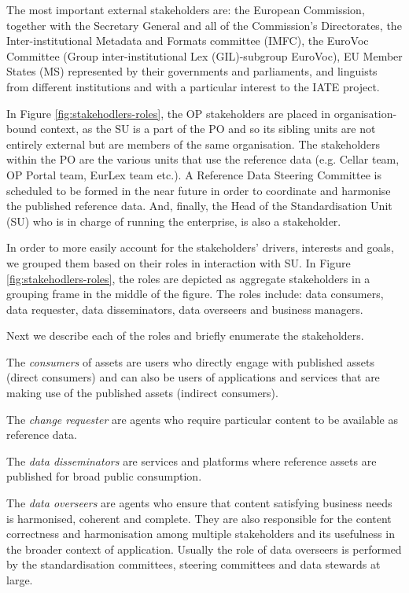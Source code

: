 	The most important external stakeholders are: the European Commission, together with the Secretary General and all of the Commission’s Directorates, the Inter-institutional Metadata and Formats committee (IMFC), the EuroVoc Committee (Group inter-institutional Lex (GIL)-subgroup EuroVoc), EU Member States (MS) represented by their governments and parliaments, and linguists from different institutions and with a particular interest to the IATE project.
	 
	In Figure \ref{fig:stakehodlers-roles}, the OP stakeholders are placed in organisation-bound context, as the SU is a part of the PO and so its sibling units are not entirely external but are members of the same organisation. The stakeholders within the PO are the various units that use the reference data (e.g. Cellar team, OP Portal team, EurLex team etc.). A Reference Data Steering Committee is scheduled to be formed in the near future in order to coordinate and harmonise the published reference data. And, finally, the Head of the Standardisation Unit (SU) who is in charge of running the enterprise, is also a stakeholder.
	 
	In order to more easily account for the stakeholders' drivers, interests and goals, we grouped them based on their roles in interaction with SU. In Figure \ref{fig:stakehodlers-roles}, the roles are depicted as aggregate stakeholders in a grouping frame in the middle of the figure. The roles include: data consumers, data requester, data disseminators, data overseers and business managers. 
	
	Next we describe each of the roles and briefly enumerate the stakeholders.
	 
	The \textit{consumers} of assets are users who directly engage with published assets (direct consumers) and can also be users of applications and services that are making use of the published assets (indirect consumers).
	
	The \textit{change requester} are agents who require particular content to be available as reference data. 
	
	The \textit{data disseminators} are services and platforms where reference assets are published for broad public consumption.
	
	The \textit{data overseers} are agents who ensure that content satisfying business needs is harmonised, coherent and complete. They are also responsible for the content correctness and harmonisation among multiple stakeholders and its usefulness in the broader context of application. Usually the role of data overseers is performed by the standardisation committees, steering committees and data stewards at large.
	
